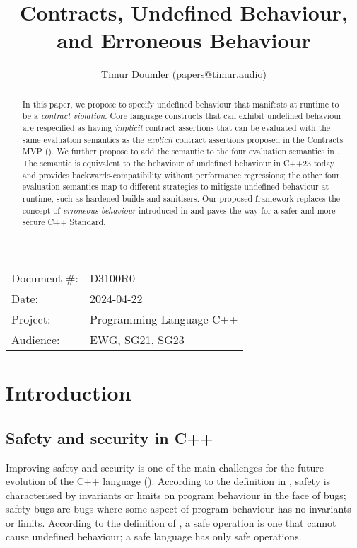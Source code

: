 

 \usepackage[bottom]{footmisc} 


\title{Contracts, Undefined Behaviour, and Erroneous Behaviour}
\author{ Timur Doumler \small(\href{mailto:papers@timur.audio}{papers@timur.audio})  
}
\date{}
\maketitle

\begin{tabular}{ll}
Document \#: & D3100R0 \\
Date: &2024-04-22 \\
Project: & Programming Language C++ \\
Audience: & EWG, SG21, SG23
\end{tabular}

\begin{abstract}
In this paper, we propose to specify undefined behaviour that manifests at runtime to be a \emph{contract violation}. Core language constructs that can exhibit undefined behaviour are respecified as having \emph{implicit} contract assertions that can be evaluated with the same evaluation semantics as the \emph{explicit} contract assertions proposed in the Contracts MVP (\cite{P2900R6}). We further propose to add the  semantic to the four evaluation semantics in \cite{P2900R6}. The  semantic is equivalent to the behaviour of undefined behaviour in C++23 today and provides backwards-compatibility without performance regressions; the other four evaluation semantics map to different strategies to mitigate undefined behaviour at runtime, such as hardened builds and sanitisers. Our proposed framework replaces the concept of \emph{erroneous behaviour} introduced in \cite{P2795R5} and paves the way for a safer and more secure C++ Standard.
\end{abstract}

\section{Introduction}
\label{sec:intro}

\subsection{Safety and security in C++}


Improving safety and security is one of the main challenges for the future evolution of the C++ language (\cite{Bastien2023}). According to the definition in \cite{Carruth2023}, safety is characterised by invariants or limits on program behaviour in the face of bugs; safety bugs are bugs where some aspect of program behaviour has no invariants or limits. According to the definition of \cite{Abrahams2023}, a safe operation is one that cannot cause undefined behaviour; a safe language has only safe operations. 

